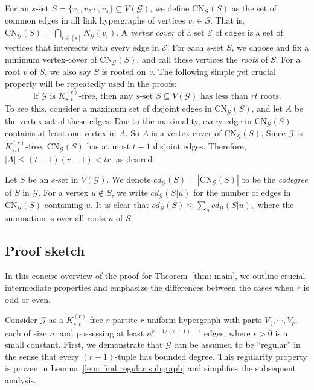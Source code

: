 \documentclass[11pt]{article}
\def\CN{\mathrm{CN}}
\begin{document}
For an $s$-set $S=\{v_1,v_2\cdots,v_{s} \} \subseteq V(\mathcal G)$, we define $\CN_{\mathcal G}(S) $ as the set of common edges in all link hypergraphs of vertices $v_i\in S$. That is, $\CN_{\mathcal G}(S)=\bigcap_{i\in [s]} N_{\mathcal G}(v_i)$.
A {\it vertex cover} of a set $\mathcal{E}$ of edges is a set of vertices that intersects with every edge in $\mathcal{E}$.
For each $s$-set $S$, we choose and fix a minimum vertex-cover of $\CN_{\mathcal G}(S)$, and call these vertices the {\it roots} of $S$.
For a root $v$ of $S$, we also say $S$ is rooted on $v$.
The following simple yet crucial property will be repeatedly used in the proofs:
\begin{equation}\label{equ:roots}
\mbox{If $\mathcal G$ is $K_{s,t}^{(r)}$-free, then any $s$-set $S\subseteq V(\mathcal{G})$ has less than $rt$ roots.}
\end{equation}
To see this, consider a maximum set of disjoint edges in $\CN_{\mathcal G}(S)$, and let $A$ be the vertex set of these edges.
Due to the maximality, every edge in $\CN_{\mathcal G}(S)$ contains at least one vertex in $A$. So $A$ is a vertex-cover of $\CN_{\mathcal G}(S)$.
Since $\mathcal G$ is $K_{s,t}^{(r)}$-free, $\CN_{\mathcal G}(S)$ has at most $t-1$ disjoint edges. Therefore, $|A|\le (t-1)(r-1)<tr$, as desired.

Let $S$ be an $s$-set in $V(\mathcal G)$.
We denote $cd_{\mathcal G}(S)=|\CN_{\mathcal G}(S)|$ to be the {\it codegree} of $S$ in $\mathcal G$.
For a vertex $u\notin S$, we write $cd_{\mathcal G}(S|u)$ for the number of edges in $\CN_{\mathcal G}(S)$ containing $u$.
It is clear that $cd_{\mathcal G}(S)\leq \sum_{u} cd_{\mathcal G}(S|u),$ where the summation is over all roots $u$ of $S$.

\subsection{Proof sketch}\label{subsec:sketch}
In this concise overview of the proof for Theorem~\ref{thm: main}, we outline crucial intermediate properties and emphasize the differences between the cases when $r$ is odd or even.

Consider $\mathcal G$ as a $K_{s,t}^{(r)}$-free $r$-partite $r$-uniform hypergraph with parts $V_1, \cdots , V_r$, each of size $n$, and possessing at least $n^{r-1/(s-1)-\epsilon}$ edges, where $\epsilon>0$ is a small constant.
First, we demonstrate that $\mathcal G$ can be assumed to be ``regular'' in the sense that every $(r-1)$-tuple has bounded degree.
This regularity property is proven in Lemma~\ref{lem: find regular subgraph} and simplifies the subsequent analysis.
\end{document}
